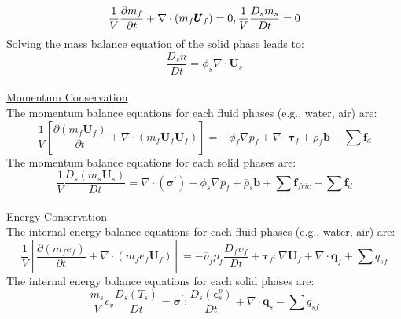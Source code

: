 \documentclass[preprint,12pt]{elsarticle}
\begin{document}
\begin{equation}
    \label{massbalance}
   \frac{1}{V}\frac{\partial m_f}{\partial t} + \nabla \cdot  (m_f \pmb{U}_f)= 0, \\ 
   \frac{1}{V}\frac{D_sm_s}{Dt} = 0    
\end {equation}
%
Solving the mass balance equation of the solid phase leads to:
%
%
\begin{equation}
  \frac{D_s n}{Dt} = \phi_s \nabla \cdot \pmb{U}_s  
\end {equation}
%
%
\underline{\hspace{5in}}\\
\underline{\textsf{Momentum Conservation}}\\
The momentum balance equations for each fluid phases (e.g., water, air) are:
%
%
\begin{equation}
     \frac{1}{V} \left[ \frac{\partial (m_f \pmb{U}_f)}{\partial t} + \nabla \cdot  (m_f \pmb{U}_f \pmb{U}_f) \right] = - \phi_f \nabla p_f  +  \nabla \cdot \pmb{\tau}_f + \overline{\rho}_f \pmb{b} +  \sum \pmb{f}_{d}
\end {equation}
%
%
The momentum balance equations for each solid phases are:
%
%
\begin{equation}
     \frac{1}{V}\frac{D_s(m_s \pmb{U}_s)}{Dt} = 
    \nabla \cdot (\pmb{\sigma}^\prime) - \phi_s \nabla p_f 
    + \overline{\rho}_s \pmb{b} +  \sum \pmb{f}_{fric}    -  \sum \pmb{f}_{d}
\end {equation}
%
%
\underline{\hspace{5in}}\\
\underline{\textsf{Energy Conservation}}\\
The internal energy balance equations for each fluid phases (e.g., water, air) are:
%
%
\begin{equation}
    \label{fluidenergy}
     \frac{1}{V} \left[ \frac{\partial (m_f e_f)}{\partial t} + \nabla \cdot  (m_f e_f \pmb{U}_f) \right]  = 
    -\overline{\rho}_f p_f  \frac{D_f\upsilon_f}{Dt} + \pmb{\tau}_f : \nabla \pmb{U}_f + \nabla \cdot \pmb{q}_f +  \sum q_{sf}
\end {equation}
%
%
The internal energy balance equations for each solid phases are:
%
%
\begin{equation}
    \label{solidenergy}
     \frac{m_s}{V}  c_v \frac{D_s( T_s)}{Dt} = \pmb{\sigma}^\prime: \frac{D_s( \pmb{\epsilon}_s^p)}{Dt} + \nabla \cdot \pmb{q}_s -  \sum q_{sf} 
\end {equation}
\end{document}
